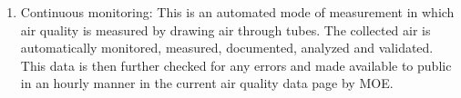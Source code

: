 \begin{enumerate}


  \item Continuous monitoring: This is an automated mode of measurement in which air quality is measured by drawing air through tubes. The collected air is automatically monitored, measured, documented, analyzed and validated. This data is then further checked for any errors and made available to public in an hourly manner in the current air quality data page by MOE.
  

\end{enumerate}
